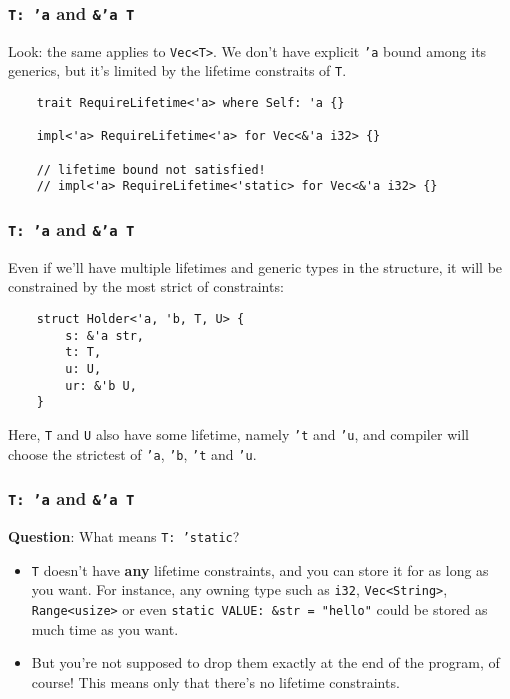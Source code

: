 \documentclass[aspectratio=1610,t]{beamer}
\begin{document}

\begin{frame}[fragile]
\frametitle{\texttt{T: 'a} and \texttt{\&'a T}}
Look: the same applies to \texttt{Vec<T>}. We don't have explicit \texttt{'a} bound among its generics, but it's limited by the lifetime constraits of \texttt{T}.

\begin{verbatim}
    trait RequireLifetime<'a> where Self: 'a {}

    impl<'a> RequireLifetime<'a> for Vec<&'a i32> {}

    // lifetime bound not satisfied!
    // impl<'a> RequireLifetime<'static> for Vec<&'a i32> {}
\end{verbatim}
\end{frame}


\begin{frame}[fragile]
\frametitle{\texttt{T: 'a} and \texttt{\&'a T}}
Even if we'll have multiple lifetimes and generic types in the structure, it will be constrained by the most strict of constraints:

\begin{verbatim}
    struct Holder<'a, 'b, T, U> {
        s: &'a str,
        t: T,
        u: U,
        ur: &'b U,
    }
\end{verbatim}

Here, \texttt{T} and \texttt{U} also have some lifetime, namely \texttt{'t} and \texttt{'u}, and compiler will choose the strictest of \texttt{'a}, \texttt{'b}, \texttt{'t} and \texttt{'u}.
\end{frame}


\begin{frame}[fragile]
\frametitle{\texttt{T: 'a} and \texttt{\&'a T}}
\textbf{Question}: What means \texttt{T: 'static}?

\begin{itemize}
    \item<2-> \texttt{T} doesn't have \textbf{any} lifetime constraints, and you can store it for as long as you want. For instance, any owning type such as \texttt{i32}, \texttt{Vec<String>}, \texttt{Range<usize>} or even \texttt{static VALUE: &str = "hello"} could be stored as much time as you want.
    \item<3-> But you're not supposed to drop them exactly at the end of the program, of course! This means only that there's no lifetime constraints.
\end{itemize}
\end{frame}
\end{document}
